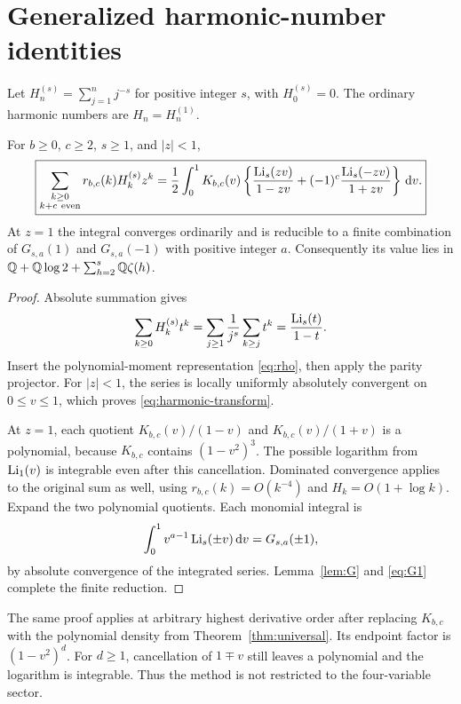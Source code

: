 \section{Generalized harmonic-number identities}
\label{sec:harmonic}

Let $H_n^{(s)}=\sum_{j=1}^n j^{-s}$ for positive integer $s$, with $H_0^{(s)}=0$. The ordinary harmonic numbers are $H_n=H_n^{(1)}$.

\begin{theorem}\label{thm:harmonic}
For $b\ge0$, $c\ge2$, $s\ge1$, and $|z|<1$,
\begin{equation}\label{eq:harmonic-transform}
 \boxed{\displaystyle
 \sum_{\substack{k\ge0\\k+c\ \mathrm{even}}}
 r_{b,c}(k)H_k^{(s)}z^k
 =\frac12\int_0^1K_{b,c}(v)
 \left\{\frac{\operatorname{Li}_s(zv)}{1-zv}
       +(-1)^c\frac{\operatorname{Li}_s(-zv)}{1+zv}\right\}\,\mathrm d v.}
\end{equation}
At $z=1$ the integral converges ordinarily and is reducible to a finite combination of $G_{s,a}(1)$ and $G_{s,a}(-1)$ with positive integer $a$. Consequently its value lies in
$\mathbb Q+\mathbb Q\log2+\sum_{h=2}^{s}\mathbb Q\zeta(h)$.
\end{theorem}

\begin{proof}
Absolute summation gives
\[
 \sum_{k\ge0}H_k^{(s)}t^k=
 \sum_{j\ge1}\frac1{j^s}\sum_{k\ge j}t^k
 =\frac{\operatorname{Li}_s(t)}{1-t}.
\]
Insert the polynomial-moment representation \eqref{eq:rho}, then apply the parity projector. For $|z|<1$, the series is locally uniformly absolutely convergent on $0\le v\le1$, which proves \eqref{eq:harmonic-transform}.

At $z=1$, each quotient $K_{b,c}(v)/(1-v)$ and $K_{b,c}(v)/(1+v)$ is a polynomial, because $K_{b,c}$ contains $(1-v^2)^3$. The possible logarithm from $\operatorname{Li}_1(v)$ is integrable even after this cancellation. Dominated convergence applies to the original sum as well, using $r_{b,c}(k)=O(k^{-4})$ and $H_k=O(1+\log k)$. Expand the two polynomial quotients. Each monomial integral is
\[
 \int_0^1v^{a-1}\operatorname{Li}_s(\pm v)\,\mathrm d v=G_{s,a}(\pm1),
\]
by absolute convergence of the integrated series. Lemma~\ref{lem:G} and \eqref{eq:G1} complete the finite reduction.
\end{proof}

The same proof applies at arbitrary highest derivative order after replacing $K_{b,c}$ with the polynomial density from Theorem~\ref{thm:universal}. Its endpoint factor is $(1-v^2)^d$. For $d\ge1$, cancellation of $1\mp v$ still leaves a polynomial and the logarithm is integrable. Thus the method is not restricted to the four-variable sector.

